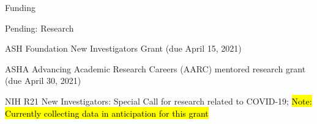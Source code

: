 \documentclass{resume} %
\begin{document}
\begin{rSection}{Funding}
\begin{rSubsection}{Pending: Research}{}{}{}
	\item ASH Foundation New Investigators Grant (due April 15, 2021)
	\item ASHA Advancing Academic Research Careers (AARC) mentored research grant (due April 30, 2021)
	\item NIH R21 New Investigators: Special Call for research related to COVID-19; \hl{Note: Currently collecting data in anticipation for this grant}
\end{rSubsection}


%
%
%
%

\end{rSection}
\end{document}
